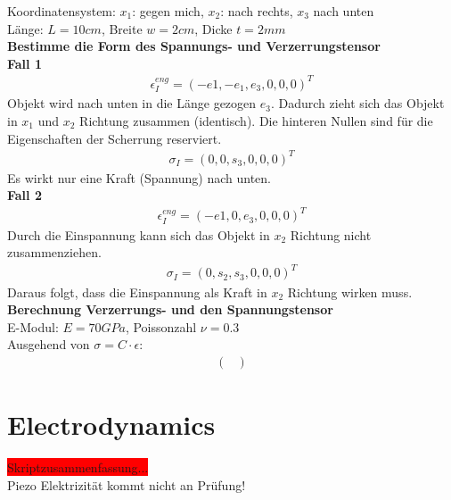 \documentclass[a4paper]{scrartcl}
\begin{document}
Koordinatensystem: $x_1$: gegen mich, $x_2$: nach rechts, $x_3$ nach unten\\
Länge: $L = 10 cm$, Breite $w=2cm$, Dicke $t=2mm$\\

\textbf{Bestimme die Form des Spannungs- und Verzerrungstensor}\\

\textbf{Fall 1}\\
\begin{align}
\epsilon_I^{eng} = (-e1, -e_1, e_3, 0, 0, 0)^T
\end{align}
Objekt wird nach unten in die Länge gezogen $e_3$. Dadurch zieht sich
das Objekt in $x_1$ und $x_2$ Richtung zusammen (identisch). Die hinteren
Nullen sind für die Eigenschaften der Scherrung reserviert.\\
\begin{align}
\sigma_I = (0,0,s_3,0,0,0)^T
\end{align}
Es wirkt nur eine Kraft (Spannung) nach unten.\\

\textbf{Fall 2}\\
\begin{align}
\epsilon_I^{eng} = (-e1, 0, e_3, 0, 0, 0)^T
\end{align}
Durch die Einspannung kann sich das Objekt in $x_2$ Richtung nicht
zusammenziehen.
\begin{align}
\sigma_I = (0,s_2,s_3,0,0,0)^T
\end{align}
Daraus folgt, dass die Einspannung als Kraft in $x_2$ Richtung wirken muss.\\

\textbf{Berechnung Verzerrungs- und den Spannungstensor}\\
E-Modul: $E = 70 GPa$, Poissonzahl $\nu = 0.3$\\
Ausgehend von $\sigma = C \cdot \epsilon$:\\
\begin{align}
\begin{pmatrix}

\end{pmatrix}
\end{align}

\section{Electrodynamics}

\colorbox{red}{Skriptzusammenfassung...}\\
Piezo Elektrizität kommt nicht an Prüfung!\\
\end{document}
